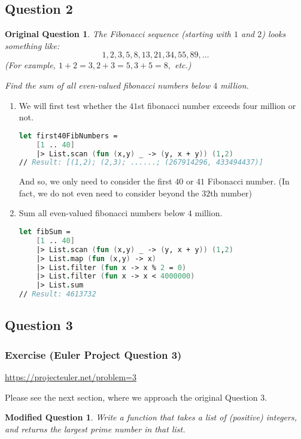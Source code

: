 \documentclass[12pt]{article}
\newtheorem*{modQuestion*}{Modified Question}
\newtheorem*{origQuestion*}{Original Question}
\begin{document}
\subsection*{Question 2} 
\begin{origQuestion*}
The Fibonacci sequence (starting with $1$ and $2$) looks something like:
\[
1, 2, 3, 5, 8, 13, 21, 34, 55, 89, \ldots
\]
(For example, $1 + 2 = 3, 2 + 3 = 5, 3 + 5 = 8,$ etc.)

Find the sum of all even-valued fibonacci numbers below $4$ million.
\end{origQuestion*}
\begin{enumerate}
\item We will first test whether the $41$st fibonacci number exceeds four million or not.
\begin{lstlisting}[language=FSharp]
let first40FibNumbers =
    [1 .. 40]
    |> List.scan (fun (x,y) _ -> (y, x + y)) (1,2)
// Result: [(1,2); (2,3); ......; (267914296, 433494437)]
\end{lstlisting}
And so, we only need to consider the first $40$ or $41$ Fibonacci number. (In fact, we do not even need to consider beyond the $32$th number)
\item Sum all even-valued fibonacci numbers below $4$ million.
\begin{lstlisting}[language=FSharp]
let fibSum =
    [1 .. 40]
    |> List.scan (fun (x,y) _ -> (y, x + y)) (1,2)
    |> List.map (fun (x,y) -> x)
    |> List.filter (fun x -> x % 2 = 0)
    |> List.filter (fun x -> x < 4000000)
    |> List.sum
// Result: 4613732
\end{lstlisting}
\end{enumerate}
\subsection*{Question 3} 
\subsubsection*{Exercise (Euler Project Question 3)}

\url{https://projecteuler.net/problem=3}

Please see the next section, where we approach the original Question $3$.

\begin{modQuestion*}
Write a function that takes a list of (positive) integers, and returns the largest prime number in that list.
\end{modQuestion*}
\end{document}
